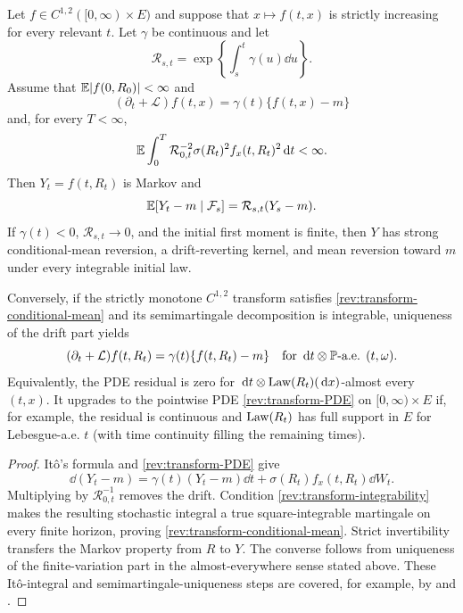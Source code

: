 \begin{theorem}
\label{rev:thm-diffusion-transform}
Let $f\in C^{1,2}([0,\infty)\times E)$ and suppose that
$x\mapsto f(t,x)$ is strictly increasing for every relevant $t$.  Let
$\gamma$ be continuous and let
\begin{equation}
\mathcal R_{s,t}=\exp\!\left\{\int_s^t\gamma(u)\dd u\right\}.
\label{rev:R-gamma}
\end{equation}
Assume that $\mathbb E|f(0,R_0)|<\infty$ and
\begin{equation}
(\partial_t+\mathcal L)f(t,x)=\gamma(t)\{f(t,x)-m\}
\label{rev:transform-PDE}
\end{equation}
and, for every $T<\infty$,
\begin{equation}
\mathbb E\int_0^T \mathcal R_{0,t}^{-2}
\sigma(R_t)^2f_x(t,R_t)^2\,\mathrm d t<\infty.
\label{rev:transform-integrability}
\end{equation}
Then $Y_t=f(t,R_t)$ is Markov and
\begin{equation}
\mathbb E[Y_t-m\mid\mathcal F_s]=\mathcal R_{s,t}(Y_s-m).
\label{rev:transform-conditional-mean}
\end{equation}
If $\gamma(t)<0$, $\mathcal R_{s,t}\to0$, and the initial first moment is finite,
then $Y$ has strong conditional-mean reversion, a drift-reverting kernel, and
mean reversion toward $m$ under every integrable initial law.

Conversely, if the strictly monotone $C^{1,2}$ transform satisfies
\eqref{rev:transform-conditional-mean} and its semimartingale decomposition is
integrable, uniqueness of the drift part yields
\begin{equation}
 (\partial_t+\mathcal L)f(t,R_t)
 =\gamma(t)\{f(t,R_t)-m\}
 \quad\text{for }\,\mathrm d t\otimes\mathbb P\text{-a.e. }(t,\omega).
\label{rev:transform-PDE-law-ae}
\end{equation}
Equivalently, the PDE residual is zero for
$\,\mathrm d t\otimes\operatorname{Law}(R_t)(\,\mathrm d x)$-almost every $(t,x)$.  It upgrades to the
pointwise PDE \eqref{rev:transform-PDE} on $[0,\infty)\times E$ if, for example,
the residual is continuous and $\operatorname{Law}(R_t)$ has full support in $E$ for
Lebesgue-a.e. $t$ (with time continuity filling the remaining times).
\end{theorem}

\begin{proof}
It\^o's formula and \eqref{rev:transform-PDE} give
\[
\dd(Y_t-m)=\gamma(t)(Y_t-m)\dd t
+\sigma(R_t)f_x(t,R_t)\dd W_t.
\]
Multiplying by $\mathcal R_{0,t}^{-1}$ removes the drift.  Condition
\eqref{rev:transform-integrability} makes the resulting stochastic integral a
true square-integrable martingale on every finite horizon, proving
\eqref{rev:transform-conditional-mean}.  Strict invertibility transfers the
  Markov property from $R$ to $Y$.  The converse follows from uniqueness of the
  finite-variation part in the almost-everywhere sense stated above.  These It\^o-integral and semimartingale-uniqueness steps
are covered, for example, by \citet{KaratzasShreve1991} and
\citet{Protter2005}.
\end{proof}

